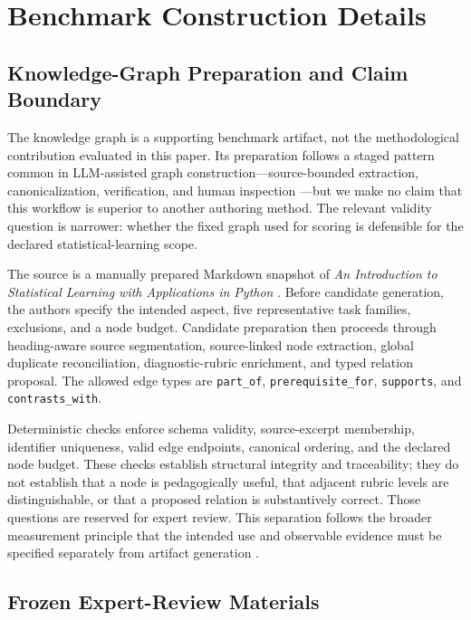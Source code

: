 \section{Benchmark Construction Details}
\label{app:construction}

\subsection{Knowledge-Graph Preparation and Claim Boundary}

The knowledge graph is a supporting benchmark artifact, not the methodological contribution evaluated in this paper. Its preparation follows a staged pattern common in LLM-assisted graph construction---source-bounded extraction, canonicalization, verification, and human inspection \citep{zhang2024edc,han2024pive,chen2024sackg,mo2025kggen}---but we make no claim that this workflow is superior to another authoring method. The relevant validity question is narrower: whether the fixed graph used for scoring is defensible for the declared statistical-learning scope.

The source is a manually prepared Markdown snapshot of \emph{An Introduction to Statistical Learning with Applications in Python} \citep{james2023islp}. Before candidate generation, the authors specify the intended aspect, five representative task families, exclusions, and a node budget. Candidate preparation then proceeds through heading-aware source segmentation, source-linked node extraction, global duplicate reconciliation, diagnostic-rubric enrichment, and typed relation proposal. The allowed edge types are \texttt{part\_of}, \texttt{prerequisite\_for}, \texttt{supports}, and \texttt{contrasts\_with}.

Deterministic checks enforce schema validity, source-excerpt membership, identifier uniqueness, valid edge endpoints, canonical ordering, and the declared node budget. These checks establish structural integrity and traceability; they do not establish that a node is pedagogically useful, that adjacent rubric levels are distinguishable, or that a proposed relation is substantively correct. Those questions are reserved for expert review. This separation follows the broader measurement principle that the intended use and observable evidence must be specified separately from artifact generation \citep{gruninger1995competency,mislevy2003ecd}.

\subsection{Frozen Expert-Review Materials}
\label{app:graph-review-materials}

